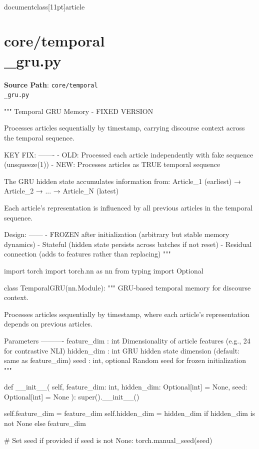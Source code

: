 \\documentclass[11pt]{article}
\begin{document}
\section*{core/temporal\\_gru.py}
\textbf{Source Path}: \texttt{core/temporal\\_gru.py}\par
\bigskip
\begin{CodeBlock}
"""
Temporal GRU Memory - FIXED VERSION

Processes articles sequentially by timestamp, carrying discourse context
across the temporal sequence.

KEY FIX:
-------
- OLD: Processed each article independently with fake sequence (unsqueeze(1))
- NEW: Processes articles as TRUE temporal sequence

The GRU hidden state accumulates information from:
  Article_1 (earliest) → Article_2 → ... → Article_N (latest)

Each article's representation is influenced by all previous articles in
the temporal sequence.

Design:
------
- FROZEN after initialization (arbitrary but stable memory dynamics)
- Stateful (hidden state persists across batches if not reset)
- Residual connection (adds to features rather than replacing)
"""

import torch
import torch.nn as nn
from typing import Optional


class TemporalGRU(nn.Module):
    """
    GRU-based temporal memory for discourse context.
    
    Processes articles sequentially by timestamp, where each article's
    representation depends on previous articles.
    
    Parameters
    ----------
    feature_dim : int
        Dimensionality of article features (e.g., 24 for contrastive NLI)
    hidden_dim : int
        GRU hidden state dimension (default: same as feature_dim)
    seed : int, optional
        Random seed for frozen initialization
    """
    
    def __init__(
        self,
        feature_dim: int,
        hidden_dim: Optional[int] = None,
        seed: Optional[int] = None
    ):
        super().__init__()
        
        self.feature_dim = feature_dim
        self.hidden_dim = hidden_dim if hidden_dim is not None else feature_dim
        
        # Set seed if provided
        if seed is not None:
            torch.manual_seed(seed)
        

\end{CodeBlock}
\end{document}
